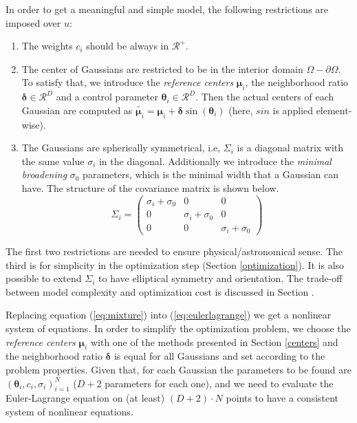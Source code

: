 \documentclass{article}
\begin{document}
In order to get a meaningful and simple model, the following restrictions are imposed over $u$:
\begin{enumerate}
    \item The weights $c_i$ should be always in $\mathcal{R}^+$.
    \item The center of Gaussians are restricted to be in the interior domain $\Omega - \partial \Omega$. To satisfy that, we introduce the \textit{reference centers} $\boldsymbol{\mu}_i$, the neighborhood ratio $\boldsymbol{\delta} \in \mathcal{R}^D$ and a control parameter $\boldsymbol{\theta}_i \in \mathcal{R}^D$. Then the actual centers of each Gaussian are computed as $\tilde{\boldsymbol{\mu}_i} = \boldsymbol{\mu}_i + \boldsymbol{\delta} \sin(\boldsymbol{\theta}_i)$ (here, $sin$ is applied element-wise).
    \item The Gaussians are spherically symmetrical, i.e, $\Sigma_i$ is a diagonal matrix with the same value $\sigma_i$ in the diagonal. Additionally we introduce the \textit{minimal broadening} $\sigma_0$ parameters, which is the minimal width that a Gaussian can have. The structure of the covariance matrix is shown below.
    \begin{equation*}
     \Sigma_i = 
     \begin{pmatrix}
     \sigma_i + \sigma_0 & 0 & 0 \\
     0 & \sigma_i + \sigma_0 & 0 \\
     0 & 0 & \sigma_i + \sigma_0
     \end{pmatrix}
    \label{eq:sigma}
    \end{equation*}
\end{enumerate}

The first two restrictions are needed to ensure physical/astronomical sense. The third is for simplicity in the optimization step (Section \ref{optimization}). It is also possible to extend $\Sigma_i$ to have elliptical symmetry and orientation. The trade-off between model complexity and optimization cost is discussed in Section \label{future}.

Replacing equation (\ref{eq:mixture}) into (\ref{eq:eulerlagrange}) we get a nonlinear system of equations. In order to simplify the optimization problem, we choose the \textit{reference centers} $\boldsymbol{\mu}_i$ with one of the methods presented in Section \ref{centers} and the neighborhood ratio $\boldsymbol{\delta}$ is equal for all Gaussians and set according to the problem properties. Given that, for each Gaussian the parameters to be found are $(\boldsymbol{\theta}_i, c_i, \sigma_i)_{i=1}^N$ ($D+2$ parameters for each one), and we need to evaluate the Euler-Lagrange equation on (at least) $(D+2)\cdot N$ points to have a consistent system of nonlinear equations.
\end{document}
